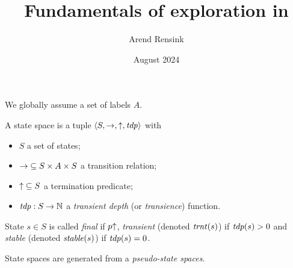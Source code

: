 \documentclass{article}
\begin{document}
\title{Fundamentals of exploration in \GROOVE}
\author{Arend Rensink}
\date{August 2024}
\maketitle

\medskip\noindent
We globally assume a set of labels $A$.

\medskip\noindent 
A state space is a tuple $\langle{S,{\rightarrow},{{\uparrow}},\ensuremath{\mathit{tdp}}}\rangle$ with
\begin{itemize}
\item $S$ a set of states;
\item ${\rightarrow}\subseteq S\times A\times S$ a transition relation;
\item ${{\uparrow}}\subseteq S$ a termination predicate;
\item ${\mathit{tdp}}:S\to \mathbb{N}$ a \emph{transient depth} (or \emph{transience}) function.
\end{itemize}
%
State $s\in S$ is called \emph{final} if $p{\uparrow}$, \emph{transient} (denoted $\mathit{trnt}(s)$) if $\mathit{tdp}(s)>0$ and \emph{stable} (denoted $\mathit{stable}(s)$) if $\mathit{tdp}(s)=0$.

\medskip\noindent State spaces are generated from a \emph{pseudo-state spaces}.
\end{document}
